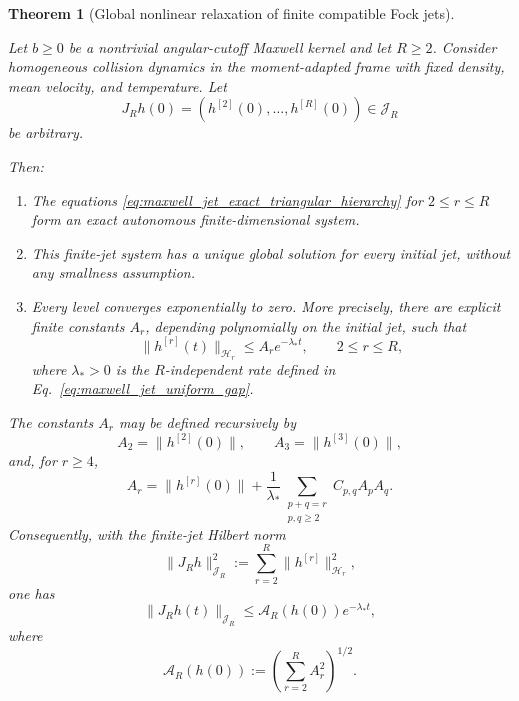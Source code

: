 \documentclass[10pt,a4paper]{amsart}
\newtheorem{theorem}{Theorem}
\begin{document}
\begin{theorem}[Global nonlinear relaxation of finite compatible Fock jets]
\label{thm:maxwell_finite_jet_relaxation}

Let $b\geq0$ be a nontrivial angular-cutoff Maxwell kernel and let
$R\geq2$.  Consider homogeneous collision dynamics in the moment-adapted
frame with fixed density, mean velocity, and temperature.  Let
\begin{equation}
J_Rh(0)
=
\left(
h^{[2]}(0),\ldots,h^{[R]}(0)
\right)
\in\mathscr J_R
\end{equation}
be arbitrary.

Then:

\begin{enumerate}
\item
The equations
\eqref{eq:maxwell_jet_exact_triangular_hierarchy} for
$2\leq r\leq R$ form an exact autonomous finite-dimensional system.

\item
This finite-jet system has a unique global solution for every initial
jet, without any smallness assumption.

\item
Every level converges exponentially to zero.  More precisely, there are
explicit finite constants $A_r$, depending polynomially on the initial
jet, such that
\begin{equation}
\|h^{[r]}(t)\|_{\mathscr H_r}
\leq
A_r e^{-\lambda_*t},
\qquad
2\leq r\leq R,
\label{eq:maxwell_jet_shell_decay}
\end{equation}
where $\lambda_*>0$ is the $R$-independent rate defined in
Eq.~\eqref{eq:maxwell_jet_uniform_gap}.
\end{enumerate}

The constants $A_r$ may be defined recursively by
\begin{equation}
A_2
=
\|h^{[2]}(0)\|,
\qquad
A_3
=
\|h^{[3]}(0)\|,
\label{eq:maxwell_jet_A23}
\end{equation}
and, for $r\geq4$,
\begin{equation}
A_r
=
\|h^{[r]}(0)\|
+
\frac{1}{\lambda_*}
\sum_{\substack{p+q=r\\p,q\geq2}}
C_{p,q}A_pA_q.
\label{eq:maxwell_jet_Ar_recursion}
\end{equation}
Consequently, with the finite-jet Hilbert norm
\begin{equation}
\|J_Rh\|_{\mathscr J_R}^2
:=
\sum_{r=2}^{R}
\|h^{[r]}\|_{\mathscr H_r}^2,
\label{eq:maxwell_jet_norm}
\end{equation}
one has
\begin{equation}
\boxed{
\|J_Rh(t)\|_{\mathscr J_R}
\leq
\mathcal A_R(h(0))
e^{-\lambda_*t},
}
\label{eq:maxwell_jet_global_decay}
\end{equation}
where
\begin{equation}
\mathcal A_R(h(0))
:=
\left(
\sum_{r=2}^{R}A_r^2
\right)^{1/2}.
\label{eq:maxwell_jet_AR_def}
\end{equation}
\end{theorem}
\end{document}
